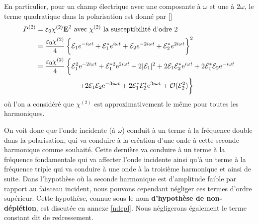 \documentclass[11pt,a4paper] { article}
\newcommand{\ncite}[1]{[\citenum{#1}]}
\newcommand{\E}{\mathcal{E}}
\newcommand{\e}[1]{\text{e}^{#1}}
\renewcommand{\v}[1]{\boldsymbol{\mathbf{#1}}}
\begin{document}
En particulier, pour un champ électrique avec une composante à $\omega$ et une à $2\omega$, le terme quadratique dans la polarisation est donné par \ncite{joffre}
\begin{equation}
\begin{aligned}
	P^{(2)} &= \varepsilon_0 \chi^{(2)} \v E^2  \text{ avec $\chi^{(2)}$ la susceptibilité d'odre 2}\\
	&= \frac{\varepsilon_0 \chi^{(2)}}{4} \left\{\mathcal E_1 e^{-i\omega t} + \mathcal E_1^* e^{i\omega t} + \mathcal E_2 e^{-2i\omega t} + \mathcal E_2^* e^{2i\omega t} \vphantom{\frac12}\right\}^2 \\
	&= \frac{\varepsilon_0 \chi^{(2)}}{4} \left\{\mathcal E_1^2 \e{-2i\omega t} + \E_1^{*2} \e{2i\omega t} + 2|\mathcal E_1|^2 + 2 \E_1\E_2^* \e{i\omega t} + 2 \E_1^*\E_2 \e{-i\omega t} \vphantom{\frac12}\right. \\
	&\qquad\qquad\qquad \left. + 2 \E_1\E_2 \e{-3 i\omega t}  + 2 \E_1^*\E_2^* \e{3 i\omega t} + \mathcal O(\E_2^2) \vphantom{\frac12}\right\} \\ 
\end{aligned}
\end{equation}
où l'on a considéré que $\chi^{(2)}$ est approximativement le même pour toutes les harmoniques. 

On voit donc que l'onde incidente (à $\omega$) conduit à un terme à la fréquence double dans la polarisation, qui va conduire à la création d'une onde à cette seconde harmonique comme souhaité. Cette dernière va conduire à un terme à la fréquence fondamentale qui va affecter l'onde incidente ainsi qu'à un terme à la fréquence triple qui va conduire à une onde à la troisième harmonique et ainsi de suite. 
Dans l'hypothèse où la seconde harmonique est d'amplitude faible par rapport au faisceau incident, nous pouvons cependant négliger ces termes d'ordre supérieur. Cette hypothèse, connue sous le nom \textbf{d'hypothèse de non-déplétion}, est discutée en annexe \ref{ndepl}. Nous négligerons également le terme constant dit de redressement. %


\end{document}
